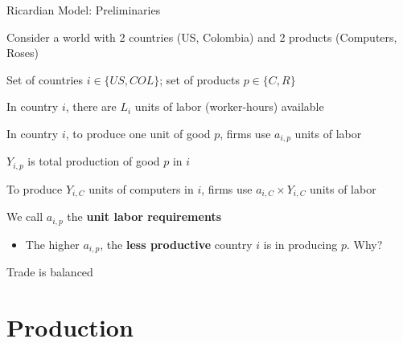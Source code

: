 \documentclass[notes,11pt, aspectratio=169, xcolor=table]{beamer}
\newenvironment{wideitemize}{\itemize\addtolength{\itemsep}{10pt}}{\enditemize}
\begin{document}
\begin{frame}{Ricardian Model: Preliminaries}
\begin{wideitemize}
        \item Consider a world with 2 countries (US, Colombia) and 2 products (Computers, Roses)
        \item Set of countries $i \in \{ US, COL\}$; set of products $p \in \{ C, R\}$
        \item In country $i$, there are $L_i$ units of labor (worker-hours) available 
        \item In country $i$, to produce one unit of good $p$, firms use $a_{i,p}$ units of labor
        \item $Y_{i,p}$ is total production of good $p$ in $i$
        \item To produce $Y_{i,C}$ units of computers in $i$, firms use $a_{i,C} \times Y_{i,C}$ units of labor 
        \item We call $a_{i,p}$ the \textbf{unit labor requirements}
        \begin{itemize}
            \item The higher $a_{i,p}$, the \textbf{less productive} country $i$ is in producing $p$. Why?
        \end{itemize}
        \item Trade is balanced
    \end{wideitemize}
\end{frame}

\section{Production}
\end{document}
